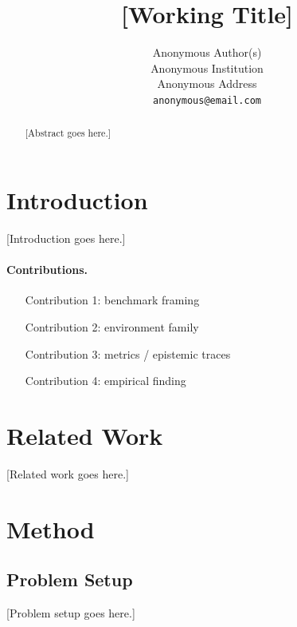 \documentclass{article}
\title{[Working Title]}
\author{%
 Anonymous Author(s) \\
 Anonymous Institution \\
 Anonymous Address \\
 \texttt{anonymous@email.com}
}
\begin{document}
\maketitle

\begin{abstract}
[Abstract goes here.]
\end{abstract}

\section{Introduction}
[Introduction goes here.]

\paragraph{Contributions.}
\begin{itemize}
  \item [Contribution 1: benchmark framing]
  \item [Contribution 2: environment family]
  \item [Contribution 3: metrics / epistemic traces]
  \item [Contribution 4: empirical finding]
\end{itemize}

\section{Related Work}
[Related work goes here.]

\section{Method}

\subsection{Problem Setup}
[Problem setup goes here.]
\end{document}

